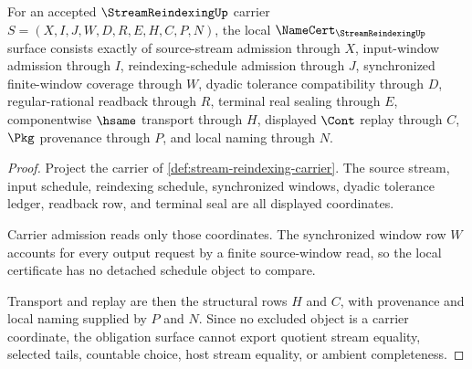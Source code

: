 \begin{theorem}
\label{thm:stream-reindexing-namecert-obligations}
For an accepted $\StreamReindexingUp$ carrier $S=(X,I,J,W,D,R,E,H,C,P,N)$, the local $\NameCert_{\StreamReindexingUp}$ surface consists exactly of source-stream admission through $X$, input-window admission through $I$, reindexing-schedule admission through $J$, synchronized finite-window coverage through $W$, dyadic tolerance compatibility through $D$, regular-rational readback through $R$, terminal real sealing through $E$, componentwise $\hsame$ transport through $H$, displayed $\Cont$ replay through $C$, $\Pkg$ provenance through $P$, and local naming through $N$.
\end{theorem}
\begin{proof}
Project the carrier of \autoref{def:stream-reindexing-carrier}. The source stream, input schedule, reindexing schedule, synchronized windows, dyadic tolerance ledger, readback row, and terminal seal are all displayed coordinates.

Carrier admission reads only those coordinates. The synchronized window row $W$ accounts for every output request by a finite source-window read, so the local certificate has no detached schedule object to compare.

Transport and replay are then the structural rows $H$ and $C$, with provenance and local naming supplied by $P$ and $N$. Since no excluded object is a carrier coordinate, the obligation surface cannot export quotient stream equality, selected tails, countable choice, host stream equality, or ambient completeness.
\end{proof}

